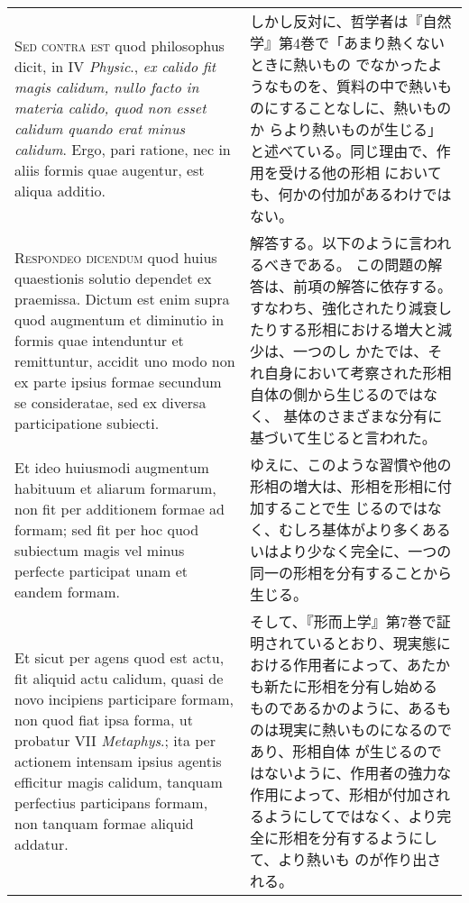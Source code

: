 \documentclass[10pt]{jsarticle} %
\begin{document}
\begin{longtable}{p{21em}p{21em}}
{\scshape Sed contra est} quod philosophus dicit, in IV {\itshape
Physic}., {\itshape ex calido fit magis calidum, nullo facto in
materia calido, quod non esset calidum quando erat minus
calidum}. Ergo, pari ratione, nec in aliis formis quae augentur, est
aliqua additio.


&

しかし反対に、哲学者は『自然学』第4巻で「あまり熱くないときに熱いもの
でなかったようなものを、質料の中で熱いものにすることなしに、熱いものか
らより熱いものが生じる」と述べている。同じ理由で、作用を受ける他の形相
においても、何かの付加があるわけではない。

\\



{\scshape Respondeo dicendum} quod huius quaestionis solutio dependet ex
praemissa. Dictum est enim supra quod augmentum et diminutio in formis
quae intenduntur et remittuntur, accidit uno modo non ex parte ipsius
formae secundum se consideratae, sed ex diversa participatione
subiecti. 


&

解答する。以下のように言われるべきである。
この問題の解答は、前項の解答に依存する。
すなわち、強化されたり減衰したりする形相における増大と減少は、一つのし
 かたでは、それ自身において考察された形相自体の側から生じるのではなく、
 基体のさまざまな分有に基づいて生じると言われた。

\\

Et ideo huiusmodi augmentum habituum et aliarum formarum,
non fit per additionem formae ad formam; sed fit per hoc quod
subiectum magis vel minus perfecte participat unam et eandem
formam. 


&

ゆえに、このような習慣や他の形相の増大は、形相を形相に付加することで生
 じるのではなく、むしろ基体がより多くあるいはより少なく完全に、一つの
 同一の形相を分有することから生じる。

\\

Et sicut per agens quod est actu, fit aliquid actu calidum,
quasi de novo incipiens participare formam, non quod fiat ipsa forma,
ut probatur VII {\itshape Metaphys}.; ita per actionem intensam ipsius agentis
efficitur magis calidum, tanquam perfectius participans formam, non
tanquam formae aliquid addatur. 


&

そして、『形而上学』第7巻で証明されているとおり、現実態における作用者によって、あたかも新たに形相を分有し始める
ものであるかのように、あるものは現実に熱いものになるのであり、形相自体
 が生じるのではないように、作用者の強力な作用によって、形相が付加され
 るようにしてではなく、より完全に形相を分有するようにして、より熱いも
 のが作り出される。


\end{longtable}
\end{document}
